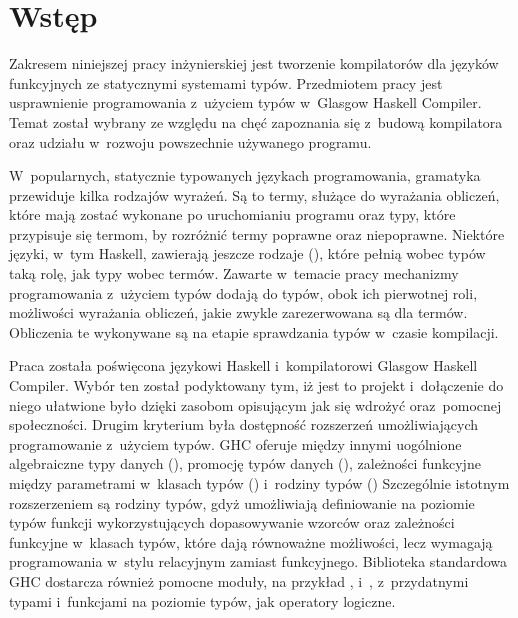 \chapter{Wstęp}\label{chap:wstep}

Zakresem niniejszej pracy inżynierskiej jest
tworzenie kompilatorów dla języków funkcyjnych ze statycznymi systemami typów.
Przedmiotem pracy jest usprawnienie
programowania z~użyciem typów w~Glasgow Haskell Compiler.
Temat został wybrany ze względu na chęć zapoznania się z~budową kompilatora oraz
udziału w~rozwoju powszechnie używanego programu.

W~popularnych, statycznie typowanych językach programowania, gramatyka przewiduje
kilka rodzajów wyrażeń. Są to termy, służące do wyrażania obliczeń, które mają zostać
wykonane po uruchomianiu programu oraz typy, które przypisuje się termom, by
rozróżnić termy poprawne oraz niepoprawne.
Niektóre języki, w~tym Haskell, zawierają jeszcze rodzaje (), które pełnią wobec
typów taką rolę, jak typy wobec termów. Zawarte w~temacie pracy mechanizmy programowania
z~użyciem typów dodają do typów, obok ich pierwotnej roli, możliwości
wyrażania obliczeń, jakie zwykle zarezerwowana są dla termów.
Obliczenia te wykonywane są na etapie sprawdzania typów w~czasie kompilacji.

Praca została poświęcona językowi Haskell i~kompilatorowi Glasgow Haskell
Compiler. Wybór ten został podyktowany tym, iż jest to projekt 
i~dołączenie do niego ułatwione było dzięki zasobom opisującym jak się wdrożyć
oraz~pomocnej społeczności.
Drugim kryterium była dostępność rozszerzeń umożliwiających
programowanie z~użyciem typów.
GHC oferuje między innymi uogólnione algebraiczne
typy danych (\cite{ExtPhantomTypes}\cite{ExtGADTs}),
promocję typów danych (\cite{ExtPromotion}),
zależności funkcyjne między parametrami w~klasach typów
(\cite{ExtFunDeps})
i~rodziny typów (\cite{ExtAssocTyFams}\cite{ExtAssocTypesWithClass}\cite{ExtClosedTyFams})
Szczególnie istotnym rozszerzeniem są rodziny typów, gdyż umożliwiają
definiowanie na poziomie typów funkcji wykorzystujących
dopasowywanie wzorców oraz zależności funkcyjne w~klasach typów,
które dają równoważne możliwości,
lecz wymagają programowania w~stylu relacyjnym zamiast funkcyjnego.
Biblioteka standardowa GHC dostarcza również pomocne moduły, na przykład ,
 i~, z~przydatnymi typami i~funkcjami na poziomie
typów, jak operatory logiczne.

